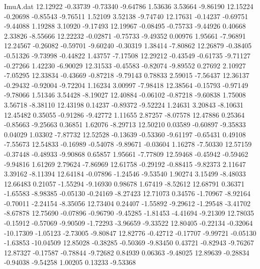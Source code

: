 \begin{filecontents}{ImuA.dat}
  12.12922   -0.33739   -0.73340   -9.64786    1.53636    3.53664   -9.86190
  12.15224   -0.20698   -0.85543   -9.76511    1.52109    3.52138   -9.74740
  12.17631   -0.14237   -0.69751   -9.44088    1.19288    3.10920   -9.17493
  12.19967   -0.08495   -0.75733   -9.44926    0.40668    2.33826   -8.55666
  12.22232   -0.02871   -0.75733   -9.49352    0.00976    1.95661   -7.96891
  12.24567   -0.26082   -0.59701   -9.60240   -0.30319    1.38414   -7.80862
  12.26879   -0.38405   -0.51326   -9.73998   -0.44822    1.43757   -7.17508
  12.29212   -0.43549   -0.61735   -9.71127   -0.27266    1.42230   -6.90029
  12.31533   -0.45583   -0.82074   -9.89552    0.27692    2.10927   -7.05295
  12.33834   -0.43669   -0.87218   -9.79143    0.78833    2.59015   -7.56437
  12.36137   -0.29432   -0.92004   -9.72204    1.16234    3.00997   -7.98418
  12.38564   -0.15793   -0.97149   -9.78066    1.51346    3.54428   -8.19027
  12.40884   -0.06102   -0.87218   -9.60838    1.75008    3.56718   -8.38110
  12.43198    0.14237   -0.89372   -9.52224    1.24631    3.20843   -8.10631
  12.45482    0.35055   -0.91286   -9.42772    1.11655    2.87257   -8.07578
  12.47886    0.25364   -0.85663   -9.25663    0.36851    1.62076   -8.29713
  12.50210    0.03589   -0.60897   -9.35833    0.04029    1.03302   -7.87732
  12.52528   -0.13639   -0.53360   -9.61197   -0.65431    0.49108   -7.55673
  12.54833   -0.16989   -0.54078   -9.89671   -0.03604    1.16278   -7.50330
  12.57159   -0.37448   -0.48933   -9.90868    0.65857    1.95661   -7.77809
  12.59468   -0.45942   -0.59462   -9.94816    1.61269    2.79624   -7.86969
  12.61758   -0.29192   -0.88415   -9.82373    2.11647    3.39162   -8.11394
  12.64184   -0.07896   -1.24546   -9.53540    1.90274    3.15499   -8.48033
  12.66483    0.21057   -1.55294   -9.16930    0.98678    1.67419   -8.52612
  12.68791    0.36371   -1.65583   -8.98385   -0.05130   -0.24169   -8.27423
  12.71073    0.34576   -1.70967   -8.92164   -0.70011   -2.24154   -8.35056
  12.73404    0.24407   -1.55892   -9.29612   -1.29548   -3.41702   -8.67878
  12.75690   -0.07896   -0.96790   -9.45285   -1.81453   -4.41694   -9.21309
  12.78035   -0.15912   -0.57069   -9.90509   -1.72293   -3.96659   -9.33522
  12.80405   -0.22134   -0.32064  -10.17309   -1.05123   -2.73005   -9.80847
  12.82776   -0.42712   -0.17707   -9.99721   -0.05130   -1.63853  -10.04509
  12.85028   -0.38285   -0.50369   -9.83450    0.43721   -0.82943   -9.76267
  12.87327   -0.17587   -0.78844   -9.72682    0.84939    0.06363   -9.48025
  12.89639   -0.28834   -0.94038   -9.54258    1.00205    0.13233   -9.53368

\end{filecontents}
